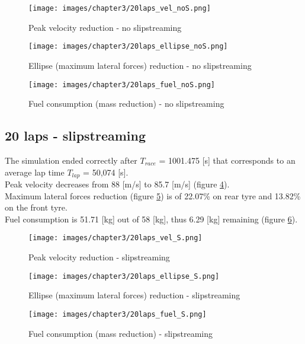 \documentclass{report}
\let\Oldsubsection\subsection
\renewcommand{\subsection}{\FloatBarrier\Oldsubsection}
\begin{document}
\begin{figure}[h!]
    \centering
    \texttt{[image: images/chapter3/20laps\_vel\_noS.png]}
    \caption{Peak velocity reduction - no slipstreaming}
    \label{fig:_res_20laps_noS_vel}
\end{figure}

\begin{figure}[h!]
    \centering
    \texttt{[image: images/chapter3/20laps\_ellipse\_noS.png]}
    \caption{Ellipse (maximum lateral forces) reduction - no slipstreaming}
    \label{fig:_res_20laps_noS_fy}
\end{figure}

\begin{figure}[h!]
    \centering
    \texttt{[image: images/chapter3/20laps\_fuel\_noS.png]}
    \caption{Fuel consumption (mass reduction) - no slipstreaming}
    \label{fig:_res_20laps_noS_fuel}
\end{figure}

\subsection{20 laps - slipstreaming}
The simulation ended correctly after $T_{race}$ = 1001.475 [s] that corresponds to an average lap time $T_{lap}$ = 50,074 [s].
\\Peak velocity decreases from 88 [m/s] to 85.7 [m/s] (figure \ref{fig:_res_20laps_S_vel}).
\\Maximum lateral forces reduction (figure \ref{fig:_res_20laps_S_fy}) is of 22.07\% on rear tyre and 13.82\% on the front tyre.
\\Fuel consumption is 51.71 [kg] out of 58 [kg], thus 6.29 [kg] remaining (figure \ref{fig:_res_20laps_S_fuel}).

\begin{figure}[h!]
    \centering
    \texttt{[image: images/chapter3/20laps\_vel\_S.png]}
    \caption{Peak velocity reduction - slipstreaming}
    \label{fig:_res_20laps_S_vel}
\end{figure}

\begin{figure}[h!]
    \centering
    \texttt{[image: images/chapter3/20laps\_ellipse\_S.png]}
    \caption{Ellipse (maximum lateral forces) reduction - slipstreaming}
    \label{fig:_res_20laps_S_fy}
\end{figure}

\begin{figure}[h!]
    \centering
    \texttt{[image: images/chapter3/20laps\_fuel\_S.png]}
    \caption{Fuel consumption (mass reduction) - slipstreaming}
    \label{fig:_res_20laps_S_fuel}
\end{figure}
\end{document}
